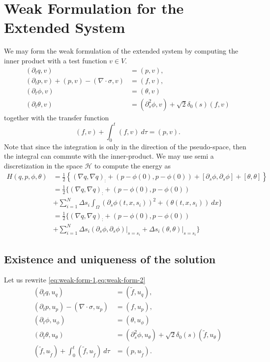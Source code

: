 \documentclass[12pt]{article}
\begin{document}
\section{Weak Formulation for the Extended System} \label{sec:weak-form}
We may form the weak formulation of the extended system by computing the inner product with a test function $v \in V$.
\begin{equation} \label{eq:weak-form-1}
\begin{aligned}
	(\partial_{t} q, v) &= ( p,v ), \\
	(\partial_{t} p,v) + (p,v) - (\nabla\cdot \sigma,v) &= (f,v), \\
	(\partial_{t} \phi,v) &= (\theta,v) \\
	(\partial_t \theta , v) &= (\partial^2_s \phi,v) + \sqrt 2 \delta_0(s) (f,v)
\end{aligned}
\end{equation}
together with the transfer function
\begin{equation} \label{eq:weak-form-2}
	(f,v) + \int_0^t(f,v) \ d\tau = (p,v).
\end{equation}
Note that since the integration is only in the direction of the pseudo-space, then the integral can commute with the inner-product. We may use semi a discretization in the space $\mathcal H$ to compute the energy as
\begin{equation}
\begin{aligned}
	H(q,p,\phi,\theta) & = \frac 1 2 \left\{ (\nabla q, \nabla q)_: + (p-\phi(0),p-\phi(0)) + [\partial_{s}\phi,\partial_{s}\phi] +  [\theta,\theta]\right\} \\
	&= \frac 1 2 \big\{ (\nabla q, \nabla q)_: + (p-\phi(0),p-\phi(0)) \\
	&+ \sum_{i=1}^{N} \Delta s_i \int_{\Omega} (\partial_{s}\phi(t,x,s_i))^2 +  (\theta(t,x,s_i)) \ dx \big\} \\
	&= \frac 1 2 \big\{ (\nabla q, \nabla q)_: + (p-\phi(0),p-\phi(0)) \\
	&+ \sum_{i=1}^{N} \Delta s_i (\partial_{s}\phi,\partial_{s}\phi)\big|_{s=s_i} + \Delta s_i(\theta,\theta)\big|_{s=s_i} \big\}
\end{aligned}
\end{equation}

\subsection{Existence and uniqueness of the solution}
Let us rewrite \cref{eq:weak-form-1,eq:weak-form-2}
\begin{equation} \label{eq:weak-form-3}
\begin{aligned}
	(\partial_{t} q, u_q) &= ( \tilde{f},u_q ), \\
	(\partial_{t} p,u_p) - (\nabla\cdot \sigma,u_p) &= (f,u_p), \\
	(\partial_{t} \phi,u_\phi) &= (\theta,u_\phi) \\
	(\partial_t \theta , u_\theta) &= (\partial^2_s \phi,u_\theta) + \sqrt 2 \delta_0(s) (\tilde{f},u_\theta) \\
	(\tilde{f},u_{\tilde{f}}) + \int_0^t(\tilde{f},u_{\tilde{f}}) \ d\tau &= (p,u_{\tilde{f}}).
\end{aligned}
\end{equation}
\end{document}

